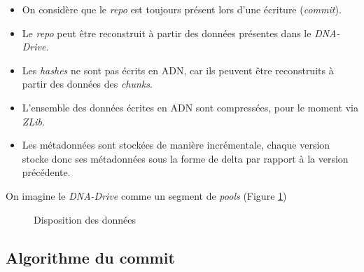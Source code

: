 \documentclass[a4paper,twocolumn]{article}
\begin{document}
\begin{itemize}
\item
  On considère que le \emph{repo} est toujours présent lors d'une
  écriture (\emph{commit}).
\item
  Le \emph{repo} peut être reconstruit à partir des données présentes
  dans le \emph{DNA-Drive}.
\item
  Les \emph{hashes} ne sont pas écrits en ADN, car ils peuvent être
  reconstruits à partir des données des \emph{chunks}.
\item
  L'ensemble des données écrites en ADN sont compressées, pour le moment
  via \emph{ZLib}.
\item
  Les métadonnées sont stockées de manière incrémentale, chaque version
  stocke donc ses métadonnées sous la forme de delta par rapport à la
  version précédente.
\end{itemize}

On imagine le \emph{DNA-Drive} comme un segment de \emph{pools} (Figure \ref{fig:data-layout})

\begin{figure}[ht]
\centering


\caption{Disposition des données}
\label{fig:data-layout}
\end{figure}

\subsection{Algorithme du commit}
\end{document}

